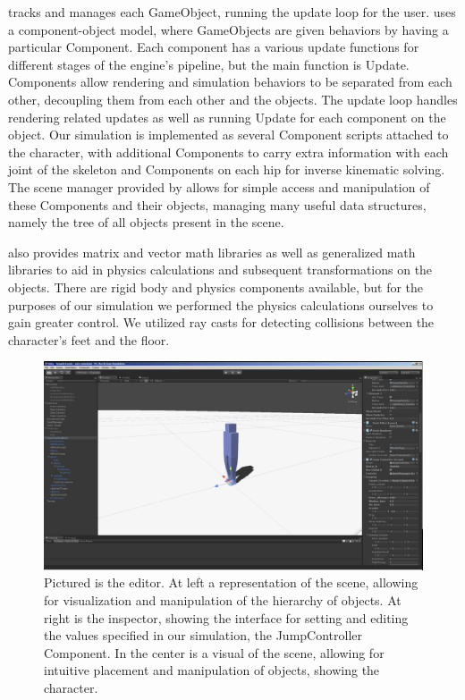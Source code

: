 	\unity{} tracks and manages each GameObject, running the update loop for the user.  \unity{} uses a component-object model, where GameObjects are given behaviors by having a particular Component.  Each component has a various update functions for different stages of the engine's pipeline, but the main function is Update.  Components allow rendering and simulation behaviors to be separated from each other, decoupling them from each other and the objects.  The update loop handles rendering related updates as well as running Update for each component on the object.  Our simulation is implemented as several Component scripts attached to the character, with additional Components to carry extra information with each joint of the skeleton and Components on each hip for inverse kinematic solving.  The scene manager provided by \unity{} allows for simple access and manipulation of these Components and their objects, managing many useful data structures, namely the tree of all objects present in the scene.   
	
	\unity{} also provides matrix and vector math libraries as well as generalized math libraries to aid in physics calculations and subsequent transformations on the objects.  There are rigid body and physics components available, but for the purposes of our simulation we performed the physics calculations ourselves to gain greater control.  We utilized \unity{} ray casts for detecting collisions between the character's feet and the floor.
	
	\begin{figure}[ht]
		\centering
		\includegraphics[width=\textwidth]{images/unityEditor.png}
		\caption[Screenshot of the \unity{} Editor]{Pictured is the \unity{} editor.  At left a representation of the scene, allowing for visualization and manipulation of the hierarchy of objects.  At right is the inspector, showing the interface for setting and editing the values specified in our simulation, the JumpController Component.  In the center is a visual of the scene, allowing for intuitive placement and manipulation of objects, showing the character.}
		\label{fig:unity_interface}
	\end{figure}	
	

